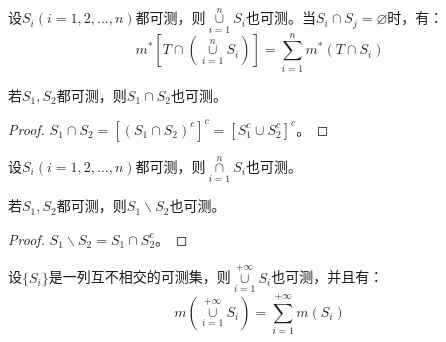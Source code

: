 \begin{corollary}\label{cor:ncup}
	设$S_i(i=1,2,\dots,n)$都可测，则$\underset{i=1}{\overset{n}{\cup}}S_i$也可测。当$S_i\cap S_j=\varnothing$时，有：
	\begin{equation*}
		m^*[T\cap(\underset{i=1}{\overset{n}{\cup}}S_i)]=\sum_{i=1}^nm^*(T\cap S_i)
	\end{equation*}
\end{corollary}
\begin{theorem}
	若$S_1,S_2$都可测，则$S_1\cap S_2$也可测。
\end{theorem}
\begin{proof}
	$S_1\cap S_2=[(S_1\cap S_2)^c]^c=[S_1^c\cup S_2^c]^c$。
\end{proof}
\begin{corollary}
	设$S_i(i=1,2,\dots,n)$都可测，则$\underset{i=1}{\overset{n}{\cap}}S_i$也可测。
\end{corollary}
\begin{theorem}
	若$S_1,S_2$都可测，则$S_1\backslash S_2$也可测。
\end{theorem}
\begin{proof}
	$S_1\backslash S_2=S_1\cap S_2^c$。
\end{proof}
\begin{theorem}
	设$\{S_i\}$是一列互不相交的可测集，则$\underset{i=1}{\overset{+\infty}{\cup}}S_i$也可测，并且有：
	\begin{equation*}
		m(\underset{i=1}{\overset{+\infty}{\cup}}S_i)=\sum_{i=1}^{+\infty} m(S_i)
	\end{equation*}
\end{theorem}
